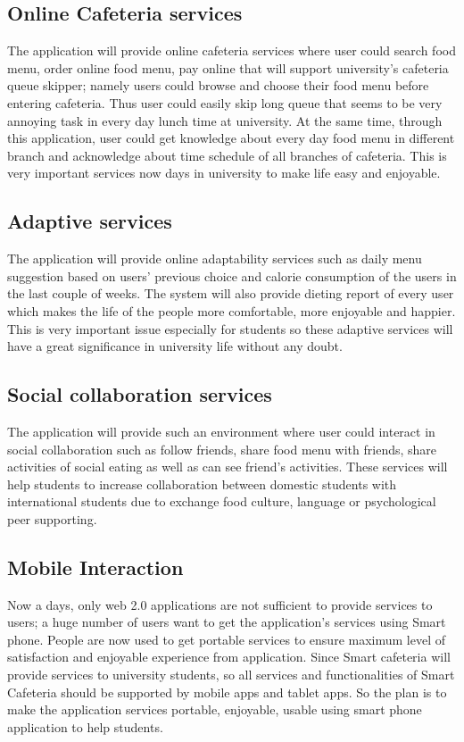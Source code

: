 \subsection{Online Cafeteria services}
The application will provide online cafeteria services where user could search
food menu, order online food menu, pay online that will support
university's cafeteria queue skipper; namely users could browse and choose their
food menu before entering cafeteria. Thus user could easily skip long queue that
seems to be very annoying task in every day lunch time at university. At the same
time, through this application, user could get knowledge about every day food
menu in different branch and acknowledge about time schedule of all branches of
cafeteria. This is very important services now days in university to make life
easy and enjoyable.

\subsection{Adaptive services}
The application will provide online adaptability services such as daily menu
suggestion based on users' previous choice and calorie consumption of the users
in the last couple of weeks. The system will also provide dieting report of
every user which makes the life of the people more comfortable, more enjoyable
and happier. This is very important issue especially for students so these
adaptive services will have a great significance in university life without any
doubt.

\subsection{Social collaboration services}
The application will provide such an environment where user could interact in
social collaboration such as follow friends, share food menu with friends, share
activities of social eating as well as can see friend's activities. These services
will help students to increase collaboration between domestic students with
international students due to exchange food culture, language or psychological
peer supporting.

\subsection{Mobile Interaction}
Now a days, only web 2.0 applications are not sufficient to provide services to
users; a huge number of users want to get the application's services using Smart
phone. People are now used to get portable services to ensure maximum level of
satisfaction and enjoyable experience from application. Since Smart cafeteria
will provide services to university students, so all services and
functionalities of Smart Cafeteria should be supported by mobile apps and tablet
apps. So the plan is to make the application services portable, enjoyable,
usable using smart phone application  to help students.

